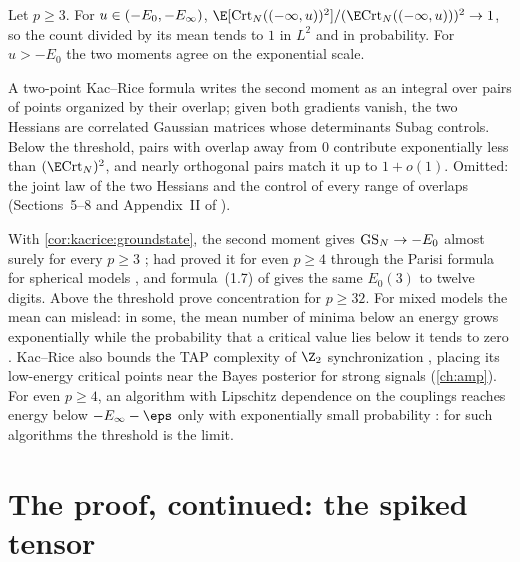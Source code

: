 \begin{refsection}
\begin{theorem}\label{thm:kacrice:subag}
Let $p\ge3$. For $u\in(-E_0,-E_\infty)$, $\E[\kacriceCrt_N((-\infty,u))^2]/(\E\kacriceCrt_N((-\infty,u)))^2\to1$, so the count divided by its mean tends to $1$ in $L^2$ and in probability. For $u>-E_0$ the two moments agree on the exponential scale.
\end{theorem}

\begin{proofsketch}
A two-point Kac--Rice formula writes the second moment as an integral over pairs of points organized by their overlap; given both gradients vanish, the two Hessians are correlated Gaussian matrices whose determinants Subag controls. Below the threshold, pairs with overlap away from $0$ contribute exponentially less than $(\E\kacriceCrt_N)^2$, and nearly orthogonal pairs match it up to $1+o(1)$. Omitted: the joint law of the two Hessians and the control of every range of overlaps (Sections~5--8 and Appendix~II of \textcite{Subag2017a}).
\end{proofsketch}

With \cref{cor:kacrice:groundstate}, the second moment gives $\mathrm{GS}_N\to-E_0$ almost surely for every $p\ge3$ \parencite[Appendix~IV]{Subag2017a}; \textcite[Theorem~2.12]{AuffingerBenArousCerny2013} had proved it for even $p\ge4$ through the Parisi formula for spherical models \parencite{Talagrand2006b}, and formula~(1.7) of \textcite{JagannathLopattoMiolane2020} gives the same $E_0(3)$ to twelve digits. Above the threshold \textcite{SubagZeitouni2021} prove concentration for $p\ge32$. For mixed models the mean can mislead: in some, the mean number of minima below an energy grows exponentially while the probability that a critical value lies below it tends to zero \parencite[Corollary~4.1]{AuffingerBenArous2013}. Kac--Rice also bounds the TAP complexity of $\Z_2$ synchronization \parencite[Theorem~1.1]{FanMeiMontanari2021}, placing its low-energy critical points near the Bayes posterior for strong signals (\cref{ch:amp}). For even $p\ge4$, an algorithm with Lipschitz dependence on the couplings reaches energy below $-\kacriceinf-\eps$ only with exponentially small probability \parencite[Theorem~5 and Proposition~2.2 of arXiv v2]{HuangSellke2025}: for such algorithms the threshold is the limit.

\section{The proof, continued: the spiked tensor}\label{sec:kacrice:spiked}


\end{refsection}
